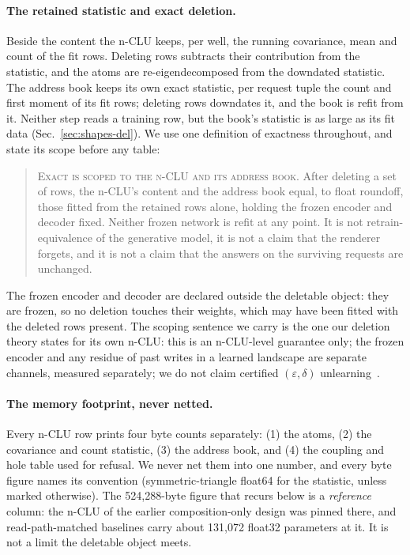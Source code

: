 \documentclass{article} %
\begin{document}
\paragraph{The retained statistic and exact deletion.} Beside the content the n-CLU keeps, per
well, the running covariance, mean and count of the fit rows. Deleting rows subtracts their
contribution from the statistic, and the atoms are re-eigendecomposed from the downdated
statistic. The address book keeps its own exact statistic, per request tuple the count and first
moment of its fit rows; deleting rows downdates it, and the book is refit from it. Neither step
reads a training row, but the book's statistic is as large as its fit data
(Sec.~\ref{sec:shapes-del}). We use one definition of exactness throughout, and state its scope
before any table:

\begin{quote}\small
\textsc{Exact is scoped to the n-CLU and its address book.} After deleting a set of rows, the n-CLU's
content and the address book equal, to float roundoff, those fitted from the retained rows alone,
holding the frozen encoder and decoder fixed. Neither frozen network is refit at any point. It is
not retrain-equivalence of the generative model, it is not a claim that the renderer forgets, and it
is not a claim that the answers on the surviving requests are unchanged.
\end{quote}

\noindent The frozen encoder and decoder are declared outside the deletable object: they are
frozen, so no deletion touches their weights, which may have been fitted with the deleted rows
present.
The scoping sentence we carry is the one our deletion theory states for its own n-CLU: this is
an n-CLU-level guarantee only; the frozen encoder and any residue of past writes in a learned
landscape are separate channels, measured separately; we do not claim certified
$(\varepsilon,\delta)$ unlearning~\citep{guo2020certified}. %



\paragraph{The memory footprint, never netted.} Every n-CLU row prints four byte counts
separately: (1) the atoms, (2) the covariance and count statistic, (3) the address book, and
(4) the coupling and hole table used for refusal. We never net them into one number, and every
byte figure names its convention (symmetric-triangle float64 for the statistic, unless marked
otherwise). The 524,288-byte figure that recurs below is a \emph{reference} column: the n-CLU
of the earlier composition-only design was pinned there, and read-path-matched baselines carry
about 131,072 float32 parameters at it. %
It is not a limit the deletable object meets.
\end{document}
